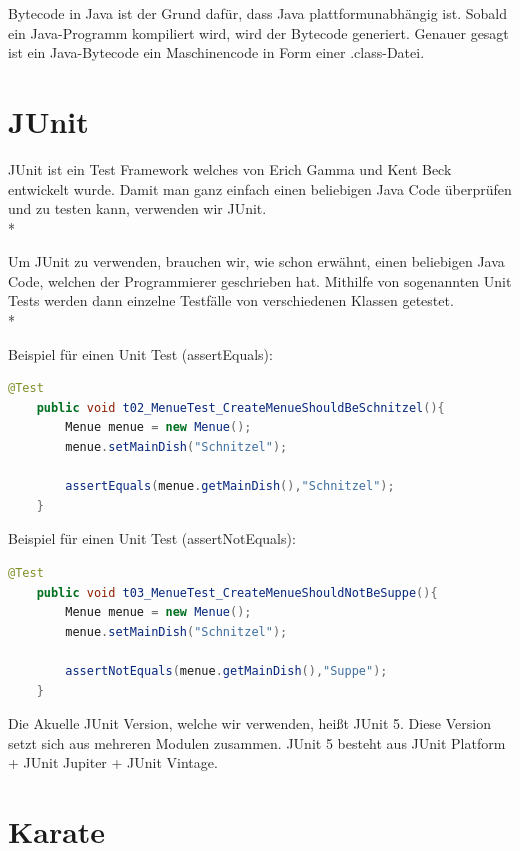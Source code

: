 Bytecode in Java ist der Grund dafür, dass Java plattformunabhängig ist. Sobald ein Java-Programm kompiliert wird, wird der Bytecode generiert. 
Genauer gesagt ist ein Java-Bytecode ein Maschinencode in Form einer .class-Datei.

\section{JUnit}
\author{David Ignjatovic} 

JUnit ist ein Test Framework welches von Erich Gamma und Kent Beck entwickelt wurde. \cite{JUnit}
Damit man ganz einfach einen beliebigen Java Code überprüfen und zu testen kann, verwenden wir JUnit. \\*

Um JUnit zu verwenden, brauchen wir, wie schon erwähnt, einen beliebigen Java Code, welchen der Programmierer geschrieben hat. 
Mithilfe von sogenannten Unit Tests werden dann einzelne Testfälle von verschiedenen Klassen getestet.\\*

Beispiel für einen Unit Test (assertEquals): 

\begin{lstlisting}[language=Java,caption=Java File JUnit 1,label=lst:impl:foo]
    @Test
    public void t02_MenueTest_CreateMenueShouldBeSchnitzel(){
        Menue menue = new Menue();
        menue.setMainDish("Schnitzel");

        assertEquals(menue.getMainDish(),"Schnitzel");
    }
\end{lstlisting}

Beispiel für einen Unit Test (assertNotEquals): 

\begin{lstlisting}[language=Java,caption=Java File JUnit 2,label=lst:impl:foo]
    @Test
    public void t03_MenueTest_CreateMenueShouldNotBeSuppe(){
        Menue menue = new Menue();
        menue.setMainDish("Schnitzel");

        assertNotEquals(menue.getMainDish(),"Suppe");
    }
\end{lstlisting}


Die Akuelle JUnit Version, welche wir verwenden, heißt JUnit 5. Diese Version setzt sich aus mehreren Modulen zusammen. JUnit 5 besteht aus JUnit Platform + JUnit Jupiter + JUnit Vintage.

\section{Karate}
\author{David Ignjatovic} 

